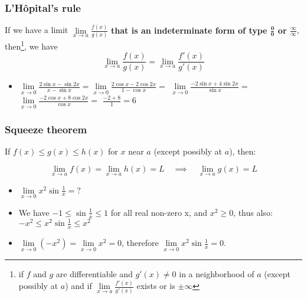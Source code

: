 \begin{frame}

\frametitle{L'Hôpital's rule}

\begin{tcolorbox}[colback=yellow!50,colframe=violet!85!black,title=L'Hôpital's rule]
    If we have a limit $\lim\limits_{x\to a}\frac{f(x)}{g(x)}$ \textbf{that is an indeterminate form of type $\pmb{\frac{0}{0}}$ or $\pmb{\frac{\infty}{\infty}}$}, then\footnote{\scriptsize if $f$ and $g$ are differentiable and $g'(x)\neq0$ in a neighborhood of $a$ (except possibly at $a$) and if $\lim\limits_{x\to a}\frac{f'(x)}{g'(x)}$ exists or is $\pm\infty$}, we have \[\lim\limits_{x\to a}\frac{f(x)}{g(x)}=\lim\limits_{x\to a}\frac{f'(x)}{g'(x)}\]

    
\end{tcolorbox}
\begin{itemize}
    \item $\lim\limits_{x\to0}\frac{2\sin x-\sin2x}{x-\sin x}=$\pause$\lim\limits_{x\to0}\frac{2\cos x-2\cos 2x}{1-\cos x}=$ \pause $\lim\limits_{x\to0}\frac{-2\sin x + 4\sin2x}{\sin x}=$ \pause $\lim\limits_{x\to0}\frac{-2\cos x + 8\cos2x}{\cos x}=$ \pause $\frac{-2+8}{1}=\boxed{6}$
\end{itemize}

\end{frame}


\begin{frame}

\frametitle{Squeeze theorem}

\begin{tcolorbox}[colback=yellow!50,colframe=violet!85!black,title=Squeeze theorem]
    If $f(x)\leq g(x)\leq h(x)$ for $x$ near $a$ (except possibly at $a$), then:

    \[\lim\limits_{x\to a}f(x)=\lim\limits_{x\to a}h(x)=L\quad\implies\quad \lim\limits_{x\to a}g(x)=L\]
    
\end{tcolorbox}
\begin{itemize}
    \item $\lim\limits_{x\to0}{x^{2}\sin\frac{1}{x}}=?$
    \item\pause We have $-1\leq\sin\frac{1}{x}\leq1$ for all real non-zero x, and $x^2\geq0$, thus also: $-x^2\leq x^2\sin\frac{1}{x}\leq x^2$
    \item\pause $\lim\limits_{x\to0}(-x^2)=\lim\limits_{x\to0}x^2=0$, therefore $\boxed{\lim\limits_{x\to0}x^2\sin\frac{1}{x}=0}$.
\end{itemize}

\end{frame}

